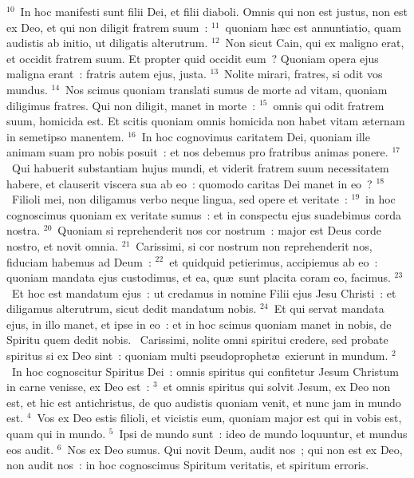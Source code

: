 ${}^{10}$~In hoc manifesti sunt filii Dei, et filii diaboli. Omnis qui non est justus, non est ex Deo, et qui non diligit fratrem suum~:
${}^{11}$~quoniam h\ae c est annuntiatio, quam audistis ab initio, ut diligatis alterutrum.
${}^{12}$~Non sicut Cain, qui ex maligno erat, et occidit fratrem suum. Et propter quid occidit eum~? Quoniam opera ejus maligna erant~: fratris autem ejus, justa.
${}^{13}$~Nolite mirari, fratres, si odit vos mundus.
${}^{14}$~Nos scimus quoniam translati sumus de morte ad vitam, quoniam diligimus fratres. Qui non diligit, manet in morte~:
${}^{15}$~omnis qui odit fratrem suum, homicida est. Et scitis quoniam omnis homicida non habet vitam \ae ternam in semetipso manentem.
${}^{16}$~In hoc cognovimus caritatem Dei, quoniam ille animam suam pro nobis posuit~: et nos debemus pro fratribus animas ponere.
${}^{17}$~Qui habuerit substantiam hujus mundi, et viderit fratrem suum necessitatem habere, et clauserit viscera sua ab eo~: quomodo caritas Dei manet in eo~?
${}^{18}$~Filioli mei, non diligamus verbo neque lingua, sed opere et veritate~:
${}^{19}$~in hoc cognoscimus quoniam ex veritate sumus~: et in conspectu ejus suadebimus corda nostra.
${}^{20}$~Quoniam si reprehenderit nos cor nostrum~: major est Deus corde nostro, et novit omnia.
${}^{21}$~Carissimi, si cor nostrum non reprehenderit nos, fiduciam habemus ad Deum~:
${}^{22}$~et quidquid petierimus, accipiemus ab eo~: quoniam mandata ejus custodimus, et ea, qu\ae\ sunt placita coram eo, facimus.
${}^{23}$~Et hoc est mandatum ejus~: ut credamus in nomine Filii ejus Jesu Christi~: et diligamus alterutrum, sicut dedit mandatum nobis.
${}^{24}$~Et qui servat mandata ejus, in illo manet, et ipse in eo~: et in hoc scimus quoniam manet in nobis, de Spiritu quem dedit nobis.
~\lettrine[lines=10,image=true,loversize=0.05,lraise=-0.03]{C}{}arissimi, nolite omni spiritui credere, sed probate spiritus si ex Deo sint~: quoniam multi pseudoprophet\ae\ exierunt in mundum.
${}^{2}$~In hoc cognoscitur Spiritus Dei~: omnis spiritus qui confitetur Jesum Christum in carne venisse, ex Deo est~:
${}^{3}$~et omnis spiritus qui solvit Jesum, ex Deo non est, et hic est antichristus, de quo audistis quoniam venit, et nunc jam in mundo est.
${}^{4}$~Vos ex Deo estis filioli, et vicistis eum, quoniam major est qui in vobis est, quam qui in mundo.
${}^{5}$~Ipsi de mundo sunt~: ideo de mundo loquuntur, et mundus eos audit.
${}^{6}$~Nos ex Deo sumus. Qui novit Deum, audit nos~; qui non est ex Deo, non audit nos~: in hoc cognoscimus Spiritum veritatis, et spiritum erroris.


